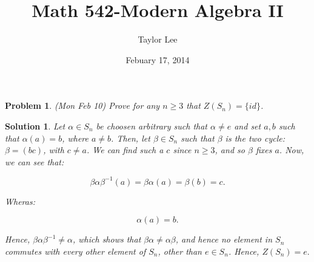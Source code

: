\documentclass[12pt]{article}
\theoremstyle{moo}
\newtheorem*{prob}{Problem}
\newtheorem*{sol}{Solution}
\begin{document}
\fontseries {\seriesdefault}
\fontshape {\shapedefault}
\selectfont

\title{ Math 542-Modern Algebra II}
\date{Febuary 17, 2014}         %
\author{Taylor Lee}      %
\maketitle                      %


\begin{prob}
(Mon Feb 10) Prove for any $n\geq 3$ that
$Z(S_n)=\{id\}$.
\end{prob}

\begin{sol}
Let $\alpha \in S_n$ be choosen arbitrary such that $\alpha \neq e$ and set $a,b$ such that $\alpha(a) = b$, where $a \neq b$. Then, let $\beta \in S_n$ such that $\beta$ is the two cycle: $\beta = (bc)$, with $c \neq a$. We can find such a $c$ since $n \geq 3$, and so $\beta $ fixes $a$. Now, we can see that:

\[
\beta \alpha \beta^{-1}(a) = \beta \alpha(a) = \beta (b) = c.
\]

Wheras:

\[
\alpha(a) = b.
\]

Hence, $\beta \alpha \beta^{-1} \neq \alpha$, which shows that $\beta \alpha \neq \alpha \beta$, and hence no element in $S_n$ commutes with every other element of $S_n$, other than $e \in S_n$. Hence, $Z(S_n)=e.$
\end{sol}
\end{document}
